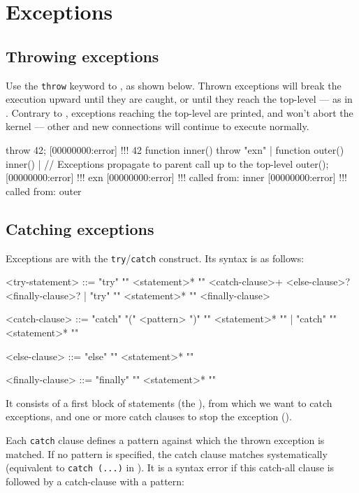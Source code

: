 \section{Exceptions}
\label{sec:lang:except}
\subsection{Throwing exceptions}
\label{sec:lang:throw}

Use the \lstinline|throw| keyword to , as shown below. Thrown exceptions will break the execution
upward until they are caught, or until they reach the top-level --- as in
\Cxx.  Contrary to \Cxx, exceptions reaching the top-level are printed, and
won't abort the kernel --- other and new connections will continue to
execute normally.

\begin{urbiscript}
throw 42;
[00000000:error] !!! 42
function inner() { throw "exn" } |
function outer() { inner() }|
// Exceptions propagate to parent call up to the top-level
outer();
[00000000:error] !!! exn
[00000000:error] !!!    called from: inner
[00000000:error] !!!    called from: outer
\end{urbiscript}

\subsection{Catching exceptions}
\label{sec:lang:catch}

Exceptions are  with the
\lstinline|try|/\lstinline|catch| construct. Its syntax is as follows:

\begin{bnf}
<try-statement>
  ::= "try" "{" <statement>* "}" <catch-clause>+ <else-clause>? <finally-clause>?
    | "try" "{" <statement>* "}" <finally-clause>

<catch-clause>
  ::= "catch" "(" <pattern> ")" "{" <statement>* "}"
    | "catch" "{" <statement>* "}"

<else-clause>
  ::= "else" "{" <statement>* "}"

<finally-clause>
  ::= "finally" "{" <statement>* "}"
\end{bnf}

It consists of a first block of statements (the ), from which
we want to catch exceptions, and one or more catch clauses to stop the
exception ().

Each \lstinline|catch| clause defines a pattern against which the thrown
exception is matched. If no pattern is specified, the catch clause matches
systematically (equivalent to \lstinline|catch (...)| in \Cxx).  It is a
syntax error if this catch-all clause is followed by a catch-clause with a
pattern:


